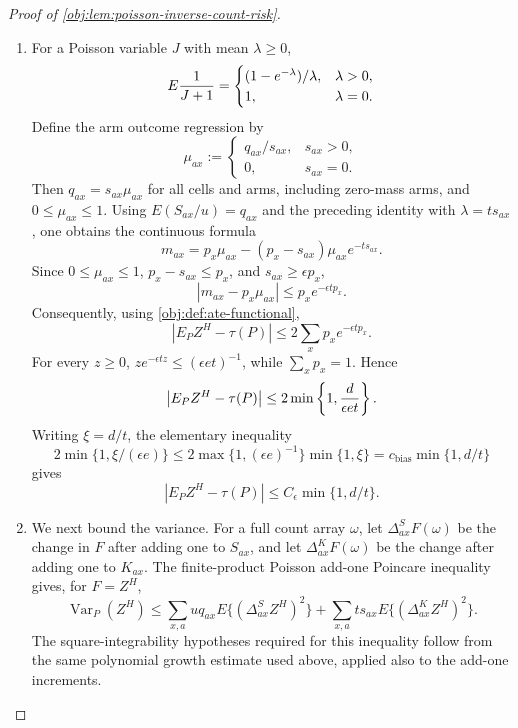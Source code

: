 \begin{proof}[Proof of \cref{obj:lem:poisson-inverse-count-risk}]
\begin{enumerate}
\item
For a Poisson variable \(J\) with mean \(\lambda\ge0\),
\[
E{1\over J+1}=
\begin{cases}
(1-e^{-\lambda})/\lambda,&\lambda>0,\\
1,&\lambda=0.
\end{cases}
\]
Define the arm outcome regression by
\[
\mu_{ax}:=
\begin{cases}
q_{ax}/s_{ax},& s_{ax}>0,\\
0,& s_{ax}=0.
\end{cases}
\]
Then \(q_{ax}=s_{ax}\mu_{ax}\) for all cells and arms, including zero-mass arms, and \(0\le \mu_{ax}\le1\).  Using \(E(S_{ax}/u)=q_{ax}\) and the preceding identity with
\(\lambda=ts_{ax}\), one obtains the continuous formula
\[
m_{ax}
=
p_x\mu_{ax}-(p_x-s_{ax})\mu_{ax}e^{-ts_{ax}}.
\]
Since \(0\le \mu_{ax}\le1\), \(p_x-s_{ax}\le p_x\), and \(s_{ax}\ge\epsilon p_x\),
\[
|m_{ax}-p_x\mu_{ax}|
\le p_x e^{-\epsilon t p_x}.
\]
Consequently, using \cref{obj:def:ate-functional},
\[
\left|E_P Z^H-\tau(P)\right|
\le
2\sum_x p_x e^{-\epsilon t p_x}.
\]
For every \(z\ge0\), \(z e^{-\epsilon tz}\le(\epsilon e t)^{-1}\), while
\(\sum_xp_x=1\).  Hence
\[
\left|E_P Z^H-\tau(P)\right|
\le
2\min\left\{1,{d\over \epsilon e t}\right\}.
\]
Writing \(\xi=d/t\), the elementary inequality
\[
2\min\{1,\xi/(\epsilon e)\}
\le
2\max\{1,(\epsilon e)^{-1}\}\min\{1,\xi\}
=
c_{\mathrm{bias}}\min\{1,d/t\}
\]
gives
\[
\left|E_P Z^H-\tau(P)\right|
\le C_\epsilon\min\{1,d/t\}.
\]

\item
We next bound the variance.  For a full count array \(\omega\), let
\(\Delta^S_{ax}F(\omega)\) be the change in \(F\) after adding one to \(S_{ax}\), and let
\(\Delta^K_{ax}F(\omega)\) be the change after adding one to \(K_{ax}\).  The finite-product Poisson add-one Poincare inequality gives, for \(F=Z^H\),
\[
\operatorname{Var}_P(Z^H)
\le
\sum_{x,a}
u q_{ax}E\{(\Delta^S_{ax}Z^H)^2\}
+
\sum_{x,a}
t s_{ax}E\{(\Delta^K_{ax}Z^H)^2\}.
\]
The square-integrability hypotheses required for this inequality follow from the same polynomial growth estimate used above, applied also to the add-one increments. %


\end{enumerate}
\end{proof}

